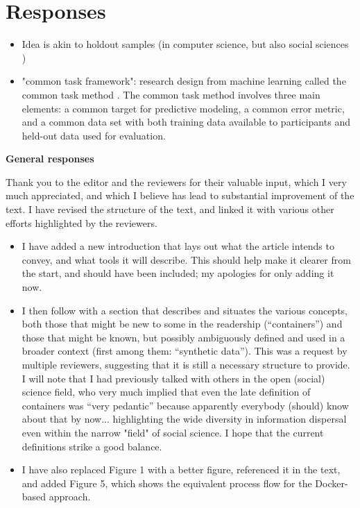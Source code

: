 \newpage
\section*{Responses}

\begin{itemize}

\item Idea is akin to holdout samples (in computer science, but also social sciences \citep{liu_successes_2019}) 
\item "common task framework": research design from machine learning called the common task method \citep{donoho_50_2017,liberman_obituary_2010}. The common task method involves three main elements: a common target for predictive modeling, a common error metric, and a common data set with both training data available to participants and held-out data used for evaluation. \citep{liu_successes_2019}

\end{itemize}

\textbf{General responses}

\begin{response}
    Thank you to the editor and the reviewers for their valuable input, which I very much appreciated, and which I believe has lead to substantial improvement of the text. I have revised the structure of the text, and linked it with various other efforts highlighted by the reviewers. 

    \begin{itemize}
        \item I have added a new introduction that lays out what the article intends to convey, and what tools it will describe. This should help make it clearer from the start, and should have been included; my apologies for only adding it now.
        \item I then follow with a section that describes and situates the various concepts, both those that might be new to some in the readership (``containers'') and those that might be known, but possibly ambiguously defined and used in a broader context (first among them: ``synthetic data''). This was a request by multiple reviewers, suggesting that it is still a necessary structure to provide. I will note that I had previously talked with others in the open (social) science field, who very much implied that even the late definition of containers was ``very pedantic'' because apparently everybody (should) know about that by now... highlighting the wide diversity in information dispersal even within the narrow "field" of social science. I hope that the current definitions strike a good balance.
        \item I have also replaced Figure 1 with a better figure, referenced it in the text, and added Figure 5, which shows the equivalent process flow for the Docker-based approach.
    \end{itemize}
\end{response}

